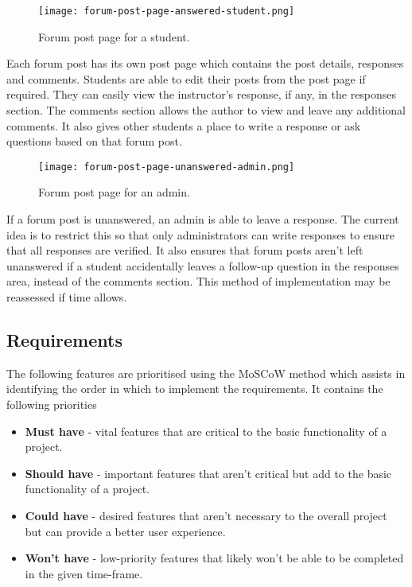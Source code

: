 \begin{figure}[h!]
    \texttt{[image: forum-post-page-answered-student.png]}
    \centering
    \caption{Forum post page for a student.}
\end{figure}

Each forum post has its own post page which contains the post details, responses and comments.
Students are able to edit their posts from the post page if required.
They can easily view the instructor's response, if any, in the responses section.
The comments section allows the author to view and leave any additional comments.
It also gives other students a place to write a response or ask questions based on that forum post.

\begin{figure}[h!]
    \texttt{[image: forum-post-page-unanswered-admin.png]}
    \centering
    \caption{Forum post page for an admin.}
\end{figure}

If a forum post is unanswered, an admin is able to leave a response.
The current idea is to restrict this so that only administrators can write responses to ensure that all responses are verified.
It also ensures that forum posts aren't left unanswered if a student accidentally leaves a follow-up question in the responses area, instead of the comments section.
This method of implementation may be reassessed if time allows.

\subsection{Requirements}
The following features are prioritised using the MoSCoW method which assists in identifying the order in which to implement the requirements. \cite{moscow}
It contains the following priorities

\begin{itemize}
    \item \textbf{Must have} - vital features that are critical to the basic functionality of a project.
    \item \textbf{Should have} - important features that aren't critical but add to the basic functionality of a project.
    \item \textbf{Could have} - desired features that aren't necessary to the overall project but can provide a better user experience.
    \item \textbf{Won't have} - low-priority features that likely won't be able to be completed in the given time-frame.
\end{itemize}

